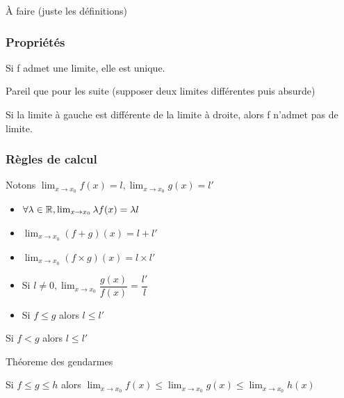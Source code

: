 \documentclass[a4paper, 12pt]{article}
\begin{document}
\begin{demonstration}
    À faire (juste les définitions)
\end{demonstration}

\subsubsection{Propriétés}

\begin{theorem}
    Si f admet une limite, elle est unique.
\end{theorem}

\begin{demonstration}
    Pareil que pour les suite (supposer deux limites différentes puis absurde)
\end{demonstration}

\begin{corollaire}
    Si la limite à gauche est différente de la limite à droite, alors f n'admet pas de limite.
\end{corollaire}

\subsubsection{Règles de calcul}

Notons $\lim_{x \to x_0}f(x) = l, \lim_{x \to x_0}g(x) = l'$

\begin{itemize}
    \item $\forall \lambda \in \mathbb{R}, \lim_{x \to x_0}\lambda f(x) = \lambda l$
    \item $\lim_{x \to x_0}(f + g)(x) = l + l'$
    \item $\lim_{x \to x_0}(f \times g)(x) = l \times l'$
    \item Si $l \neq 0, \lim_{x \to x_0}\dfrac{g(x)}{f(x)} = \dfrac{l'}{l}$
    \item Si $f \leq g$ alors $l \leq l'$
\end{itemize}

\begin{remark}
    Si $f \lt g$ alors $l \leq l'$
\end{remark}

\begin{theorem}
    Théoreme des gendarmes

    Si $f \leq g \leq h$ alors $\lim_{x \to x_0}f(x) \leq \lim_{x \to x_0}g(x) \leq \lim_{x \to x_0}h(x)$
\end{theorem}
\end{document}
